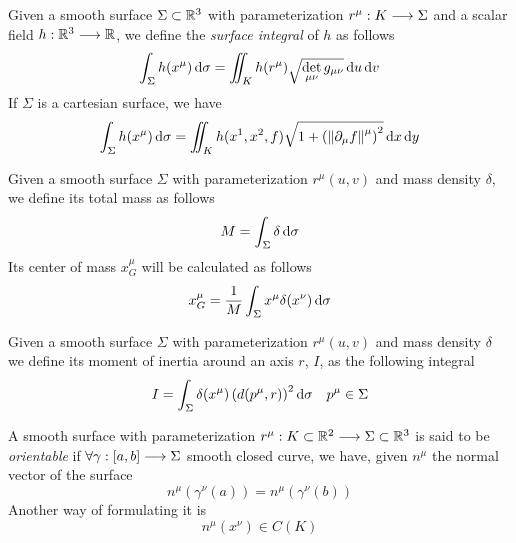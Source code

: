 \documentclass[../complete.tex]{subfiles}
\begin{document}
\begin{dfn}
	Given a smooth surface $\Sigma\subset\mathbb{R}^3$ with parameterization $r^\mu:K\overset{}{\longrightarrow}\Sigma$ and a scalar field $h:\mathbb{R}^3\overset{}{\longrightarrow}\mathbb{R}$, we define the \textit{surface integral} of $h$ as follows
	\begin{equation}
		\int_\Sigma h(x^\mu)\operatorname{d\!}\sigma=\iint_Kh(r^\mu)\sqrt{\det_{\mu\nu}g_{\mu\nu}}\operatorname{d\!} u\operatorname{d\!} v
		\label{eq:surfaceint}
	\end{equation}
	If $\Sigma$ is a cartesian surface, we have
	\begin{equation}
		\int_{\Sigma}^{}h(x^\mu)\operatorname{d\!}\sigma=\iint_Kh(x^1,x^2,f)\sqrt{1+\left( \norm{\partial_\mu f}^\mu \right)^2}\operatorname{d\!} x\operatorname{d\!} y
		\label{eq:cartesiansurfaceint}
	\end{equation}
\end{dfn}
\begin{dfn}
	Given a smooth surface $\Sigma$ with parameterization $r^\mu(u,v)$ and mass density $\delta$, we define its total mass as follows
	\begin{equation}
		M=\int_\Sigma\delta\operatorname{d\!}\sigma
		\label{eq:totalmasssurf}
	\end{equation}
	Its center of mass $x_G^\mu$ will be calculated as follows
	\begin{equation}
		x_G^\mu=\frac{1}{M}\int_\Sigma x^\mu\delta(x^\nu)\operatorname{d\!}\sigma
		\label{eq:centerofmasssurf}
	\end{equation}
\end{dfn}
\begin{dfn}
	Given a smooth surface $\Sigma$ with parameterization $r^\mu(u,v)$ and mass density $\delta$ we define its moment of inertia around an axis $r$, $I$, as the following integral
	\begin{equation}
		I=\int_\Sigma\delta(x^\mu)\left( d(p^\mu,r) \right)^2\operatorname{d\!}\sigma\quad p^\mu\in\Sigma
		\label{eq:momentofinertia}
	\end{equation}
\end{dfn}
\begin{dfn}
	A smooth surface with parameterization $r^\mu:K\subset\mathbb{R}^2\overset{}{\longrightarrow}\Sigma\subset\mathbb{R}^3$ is said to be \textit{orientable} if $\forall\gamma:[a,b]\overset{}{\longrightarrow}\Sigma$ smooth closed curve, we have, given $n^\mu$ the normal vector of the surface
	\begin{equation}
		n^\mu(\gamma^\nu(a))=n^\mu(\gamma^\nu(b))
		\label{eq:orientabilitysurf}
	\end{equation}
	Another way of formulating it is
	\begin{equation}
		n^\mu(x^\nu)\in C(K)
		\label{eq:orientability2}
	\end{equation}
\end{dfn}
\end{document}
